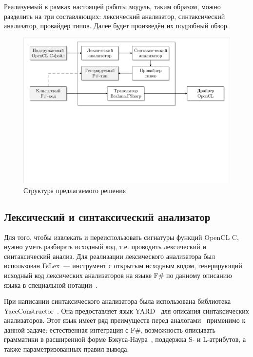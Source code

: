 Реализуемый в рамках настоящей работы модуль, таким образом, можно разделить на три составляющих: лексический анализатор, синтаксический анализатор, провайдер типов. Далее будет произведён их подробный обзор.

\begin{figure}[h]
\centering
\includegraphics[width=\textwidth]{Smirenko/courseworkpictures/architecture.pdf}
\caption{Структура предлагаемого решения}
\label{architecture}
\end{figure}

\subsection{Лексический и синтаксический анализатор}
Для того, чтобы извлекать и переиспользовать сигнатуры функций OpenCL C, нужно уметь разбирать исходный код, т.е. проводить лексический и синтаксический анализ. Для реализации лексического анализатора был использован FsLex~--- инструмент с открытым исходным кодом, генерирующий исходный код лексических анализаторов на языке F\# по данному описанию языка в специальной нотации~\cite{FsLex}.

При написании синтаксического анализатора была использована библиотека YaccConstructor~\cite{YaccConstructorPaper, YaccConstructorPage}. Она предоставляет язык YARD~\cite{YARD} для описания синтаксических анализаторов. Этот язык имеет ряд преимуществ перед аналогами~\cite{ANTLR, Yacc} применимо к данной задаче: естественная интеграция с F\#, возможность описывать грамматики в расширенной форме Бэкуса-Наура~\cite{EBNF}, поддержка S- и L-атрибутов, а также параметризованных правил вывода.

